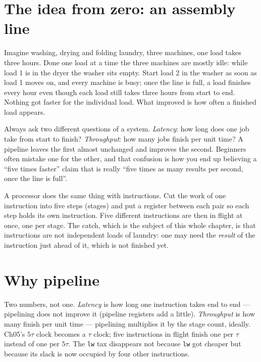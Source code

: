 \section{The idea from zero: an assembly line}
\label{sec:zero06}

Imagine washing, drying and folding laundry, three machines, one
load takes three hours. Done one load at a time the three machines
are mostly idle: while load 1 is in the dryer the washer sits empty.
Start load 2 in the washer as soon as load 1 moves on, and every
machine is busy; once the line is full, a load finishes every hour
even though each load still takes three hours from start to end.
Nothing got faster for the individual load. What improved is how often
a finished load appears.

\begin{principle}
Always ask two different questions of a system. \emph{Latency}: how
long does one job take from start to finish? \emph{Throughput}: how
many jobs finish per unit time? A pipeline leaves the first almost
unchanged and improves the second. Beginners often mistake one for the
other, and that confusion is how you end up believing a ``five times
faster'' claim that is really ``five times as many results per
second, once the line is full''.
\end{principle}

A processor does the same thing with instructions. Cut the work of one
instruction into five steps (stages) and put a register between each
pair so each step holds its own instruction. Five different
instructions are then in flight at once, one per stage. The catch,
which is the subject of this whole chapter, is that instructions are
not independent loads of laundry: one may need the \emph{result} of the
instruction just ahead of it, which is not finished yet.


\section{Why pipeline}
\label{sec:why06}

Two numbers, not one. \emph{Latency} is how long one instruction
takes end to end --- pipelining does not improve it (pipeline
registers add a little). \emph{Throughput} is how many finish per
unit time --- pipelining multiplies it by the stage count, ideally.
Ch05's $5\tau$ clock becomes a $\tau$ clock; five instructions in
flight finish one per $\tau$ instead of one per $5\tau$. The
\texttt{lw} tax disappears not because \texttt{lw} got cheaper but
because its slack is now occupied by four other instructions.

